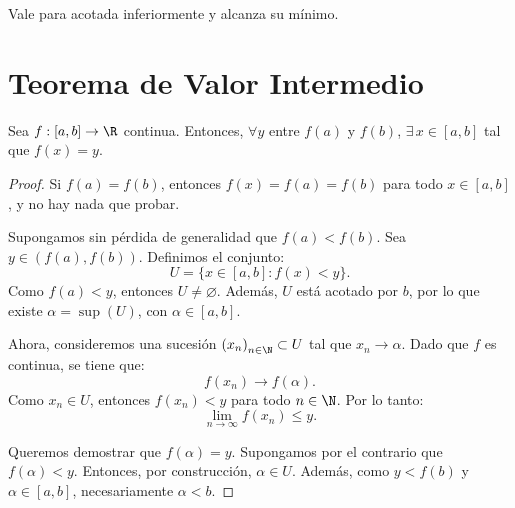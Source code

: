 \begin{note}
    Vale para acotada inferiormente y alcanza su mínimo.
\end{note}

\newpage

\section{Teorema de Valor Intermedio}

\begin{theorem}
    Sea \(f: [a, b] \to \R \) continua. Entonces, \(\forall y \) entre \(f(a)\) y \(f(b)\), \(\exists \, x \in [a, b]\) tal que \(f(x) = y\).
    \begin{proof}
        Si \(f(a) = f(b)\), entonces \(f(x) = f(a) = f(b)\) para todo \(x \in [a, b]\), y no hay nada que probar.

        Supongamos sin pérdida de generalidad que \(f(a) < f(b)\). Sea \(y \in (f(a), f(b))\). Definimos el conjunto:
        \[
            U = \{x \in [a, b] : f(x) < y \}.
        \]
        Como \(f(a) < y\), entonces \(U \neq \varnothing \). Además, \(U\) está acotado por \(b\), por lo que existe \(\alpha = \sup(U)\), con \(\alpha \in [a, b]\).

        Ahora, consideremos una sucesión \({(x_n)}_{n \in \N} \subset U\) tal que \(x_n \to \alpha \). Dado que \(f\) es continua, se tiene que:
        \[
            f(x_n) \to f(\alpha).
        \]
        Como \(x_n \in U\), entonces \(f(x_n) < y\) para todo \(n \in \N \). Por lo tanto:
        \[
            \lim_{n \to \infty} f(x_n) \leq y.
        \]

        Queremos demostrar que \(f(\alpha) = y\). Supongamos por el contrario que \(f(\alpha) < y\). Entonces, por construcción, \(\alpha \in U \).
        Además, como \(y < f(b)\) y \(\alpha \in [a, b]\), necesariamente \(\alpha < b\).


\end{proof}
\end{theorem}
